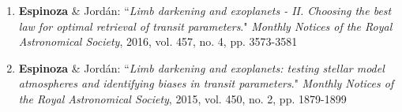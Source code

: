 \documentclass[12pt, a4paper]{article} %
\begin{document}
\begin{flushleft}
\begin{enumerate}
\item \textbf{Espinoza} \& Jordán: ``\textit{Limb darkening and exoplanets - II. Choosing the best law for optimal retrieval of transit parameters}." \textit{Monthly Notices of the Royal Astronomical Society}, 2016, vol. 457, no. 4, pp. 3573-3581

\item \textbf{Espinoza} \& Jordán: ``\textit{Limb darkening and exoplanets: testing stellar model atmospheres and identifying biases in transit parameters}." \textit{Monthly Notices of the Royal Astronomical Society}, 2015, vol. 450, no. 2, pp. 1879-1899

\end{enumerate}

\end{flushleft}
\end{document}
